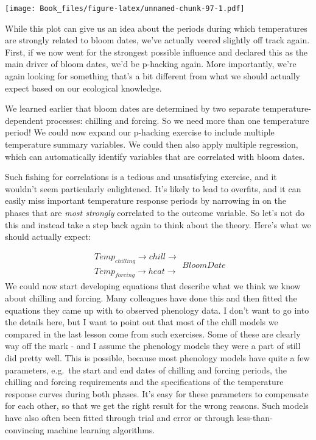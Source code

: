 \documentclass[
]{book}
\begin{document}
\texttt{[image: Book\_files/figure-latex/unnamed-chunk-97-1.pdf]}

While this plot can give us an idea about the periods during which temperatures are strongly related to bloom dates, we've actually veered slightly off track again. First, if we now went for the strongest possible influence and declared this as the main driver of bloom dates, we'd be p-hacking again. More importantly, we're again looking for something that's a bit different from what we should actually expect based on our ecological knowledge.

We learned earlier that bloom dates are determined by two separate temperature-dependent processes: chilling and forcing. So we need more than one temperature period! We could now expand our p-hacking exercise to include multiple temperature summary variables. We could then also apply multiple regression, which can automatically identify variables that are correlated with bloom dates.

Such fishing for correlations is a tedious and unsatisfying exercise, and it wouldn't seem particularly enlightened. It's likely to lead to overfits, and it can easily miss important temperature response periods by narrowing in on the phases that are \emph{most strongly} correlated to the outcome variable. So let's not do this and instead take a step back again to think about the theory. Here's what we should actually expect:

\[\substack{Temp_{chilling} \to chill \to\\ Temp_{forcing} \to heat \to} BloomDate\]
We could now start developing equations that describe what we think we know about chilling and forcing. Many colleagues have done this and then fitted the equations they came up with to observed phenology data. I don't want to go into the details here, but I want to point out that most of the chill models we compared in the last lesson come from such exercises. Some of these are clearly way off the mark - and I assume the phenology models they were a part of still did pretty well. This is possible, because most phenology models have quite a few parameters, e.g.~the start and end dates of chilling and forcing periods, the chilling and forcing requirements and the specifications of the temperature response curves during both phases. It's easy for these parameters to compensate for each other, so that we get the right result for the wrong reasons. Such models have also often been fitted through trial and error or through less-than-convincing machine learning algorithms.
\end{document}
